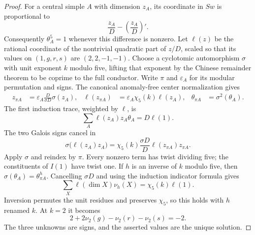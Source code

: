 \begin{proof}
For a central simple $A$ with dimension $z_A$, its coordinate in $Sw$
is proportional to
\[
 \frac{z_A}{D}-\left(\frac{z_A}{D}\right)'.
\]
Consequently $\theta_A^5=1$ whenever this difference is nonzero.
Let $\ell(z)$ be the rational coordinate of the nontrivial quadratic
part of $z/D$, scaled so that its values on $(1,g,r,s)$ are
$(2,2,-1,-1)$. Choose a cyclotomic automorphism $\sigma$ with unit
exponent $k$ modulo five, lifting that exponent by the Chinese remainder
theorem to be coprime to the full conductor. Write $\pi$ and
$\varepsilon_A$ for its modular permutation and signs. The canonical
anomaly-free center normalization gives
\begin{align*}
 z_{\pi A}&=\varepsilon_A\frac D{\sigma D}\sigma(z_A),&
 \ell(z_{\pi A})&=\varepsilon_A\chi_5(k)\ell(z_A),&
 \theta_{\pi A}&=\sigma^2(\theta_A).
\end{align*}
The first induction trace, weighted by $\ell$, is
\[
 \sum_A\ell(z_A)z_A\theta_A=D\ell(1).
\]
The two Galois signs cancel in
\[
 \sigma\bigl(\ell(z_A)z_A\bigr)
 =\chi_5(k)\frac{\sigma D}{D}\ell(z_{\pi A})z_{\pi A}.
\]
Apply $\sigma$ and reindex by $\pi$. Every nonzero term has twist
dividing five; the constituents of $I(1)$ have twist one. If $h$ is
an inverse of $k$ modulo five, then
$\sigma(\theta_A)=\theta_{\pi A}^{h}$. Cancelling $\sigma D$ and
using the induction indicator formula \cite[Theorem~4.1]{NgIndicators}
gives
\[
 \sum_X\ell(\dim X)\nu_h(X)=\chi_5(k)\ell(1).
\]
Inversion permutes the unit residues and preserves $\chi_5$, so this
holds with $h$ renamed $k$. At $k=2$ it becomes
\[
 2+2\nu_2(g)-\nu_2(r)-\nu_2(s)=-2.
\]
The three unknowns are signs, and the asserted values are the unique
solution.
\end{proof}

